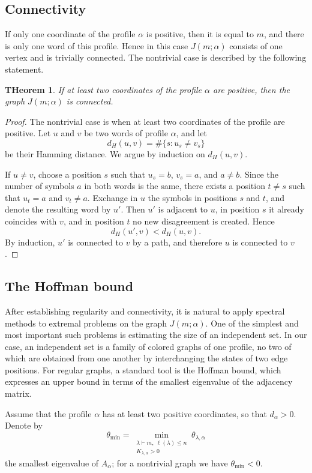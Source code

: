 \documentclass[12pt,reqno]{amsart}
\newtheorem{theorem}{THeorem}[section]
\begin{document}
\subsection{Connectivity}


If only one coordinate of the profile $\alpha$ is positive, then it is
equal to $m$, and there is only one word of this profile. Hence in this
case $J(m;\alpha)$ consists of one vertex and is trivially connected. The
nontrivial case is described by the following statement.

\begin{theorem}
If at least two coordinates of the profile $\alpha$ are positive, then the
graph $J(m;\alpha)$ is connected.
\end{theorem}

\begin{proof}
The nontrivial case is when at least two coordinates of the profile are
positive. Let $u$ and $v$ be two words of profile $\alpha$, and let
$$
d_H(u,v)=\#\{s:u_s\ne v_s\}
$$
be their Hamming distance. We argue by induction on $d_H(u,v)$.

If $u\ne v$, choose a position $s$ such that
$u_s=b$, $v_s=a$, and $a\ne b$. Since the number of symbols $a$ in both
words is the same, there exists a position $t\ne s$ such that
$u_t=a$ and $v_t\ne a$. Exchange in $u$ the symbols in positions $s$ and
$t$, and denote the resulting word by $u'$. Then $u'$ is adjacent to $u$,
in position $s$ it already coincides with $v$, and in position $t$ no new
disagreement is created. Hence
$$
d_H(u',v)<d_H(u,v).
$$
By induction, $u'$ is connected to $v$ by a path, and therefore $u$ is
connected to $v$.
\end{proof}

\subsection{The Hoffman bound}
After establishing regularity and connectivity, it is natural to apply
spectral methods to extremal problems on the graph $J(m;\alpha)$. One of
the simplest and most important such problems is estimating the size of an
independent set. In our case, an independent set is a family of colored
graphs of one profile, no two of which are obtained from one another by
interchanging the states of two edge positions. For regular graphs, a
standard tool is the Hoffman bound, which expresses an upper bound in
terms of the smallest eigenvalue of the adjacency matrix.

Assume that the profile $\alpha$ has at least two positive coordinates, so
that $d_\alpha>0$. Denote by
$$
\theta_{\min}
=
\min_{\substack{\lambda\vdash m,\ \ell(\lambda)\le n\\
K_{\lambda,\alpha}>0}}
\theta_{\lambda,\alpha}
$$
the smallest eigenvalue of $A_\alpha$; for a nontrivial graph we have
$\theta_{\min}<0$.
\end{document}
